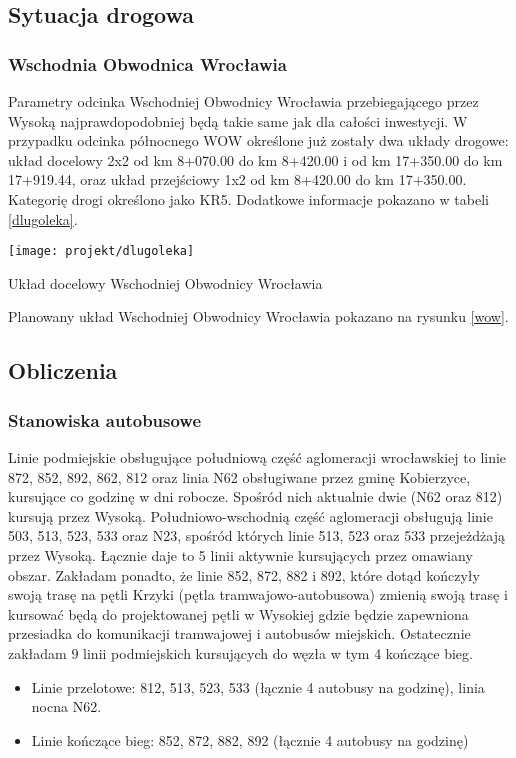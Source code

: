\documentclass[twoside,12pt]{article}
\begin{document}
\subsection{Sytuacja drogowa}

	\subsubsection{Wschodnia Obwodnica Wrocławia}
	
	Parametry odcinka Wschodniej Obwodnicy Wrocławia przebiegającego przez Wysoką najprawdopodobniej będą takie same jak dla całości inwestycji. W przypadku odcinka północnego WOW określone już zostały dwa układy drogowe: układ docelowy 2x2 od km 8+070.00 do km 8+420.00 i od km 17+350.00 do km 17+919.44, oraz układ przejściowy 1x2 od km 8+420.00 do km 17+350.00. Kategorię drogi określono jako KR5. Dodatkowe informacje pokazano w tabeli \ref{dlugoleka}.
	
	\begin{table}[H]
		\centering
		\texttt{[image: projekt/dlugoleka]}
		\caption{Układ docelowy Wschodniej Obwodnicy Wrocławia}
		\label{dlugoleka}
	\end{table}
	
	Planowany układ Wschodniej Obwodnicy Wrocławia pokazano na rysunku \ref{wow}. 
	
	
\subsection{Obliczenia}

	\subsubsection{Stanowiska autobusowe}
	
	Linie podmiejskie obsługujące południową część aglomeracji wrocławskiej to linie 872, 852, 892, 862, 812 oraz linia N62 obsługiwane przez gminę Kobierzyce, kursujące co godzinę w dni robocze. Spośród nich aktualnie dwie (N62 oraz 812) kursują przez Wysoką. Południowo-wschodnią część aglomeracji obsługują linie 503, 513, 523, 533 oraz N23, spośród których linie 513, 523 oraz 533 przejeżdżają przez Wysoką. Łącznie daje to 5 linii aktywnie kursujących przez omawiany obszar. Zakładam ponadto, że linie 852, 872, 882 i 892, które dotąd kończyły swoją trasę na pętli Krzyki (pętla tramwajowo-autobusowa) zmienią swoją trasę i kursować będą do projektowanej pętli w Wysokiej gdzie będzie zapewniona przesiadka do komunikacji tramwajowej i autobusów miejskich. Ostatecznie zakładam 9 linii podmiejskich kursujących do węzła w tym 4 kończące bieg.
	\begin{itemize}
	\item Linie przelotowe: 812, 513, 523, 533 (łącznie 4 autobusy na godzinę), linia nocna N62.
	\item Linie kończące bieg: 852, 872, 882, 892 (łącznie 4 autobusy na godzinę)
	\end{itemize}
	
\end{document}
